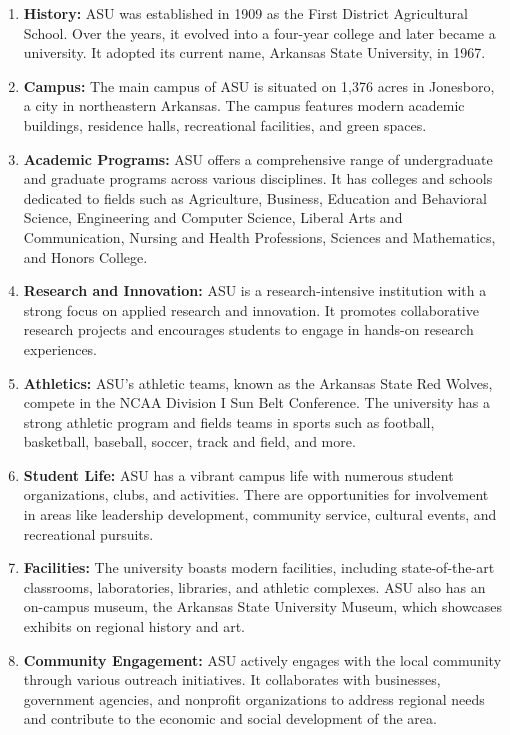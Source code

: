 \documentclass[
  letterpaper,
  DIV=11,
  numbers=noendperiod]{scrartcl}
\begin{document}
\begin{enumerate}
\def\labelenumi{\arabic{enumi}.}
\item
  \textbf{History:} ASU was established in 1909 as the First District
  Agricultural School. Over the years, it evolved into a four-year
  college and later became a university. It adopted its current name,
  Arkansas State University, in 1967.
\item
  \textbf{Campus:} The main campus of ASU is situated on 1,376 acres in
  Jonesboro, a city in northeastern Arkansas. The campus features modern
  academic buildings, residence halls, recreational facilities, and
  green spaces.
\item
  \textbf{Academic Programs:} ASU offers a comprehensive range of
  undergraduate and graduate programs across various disciplines. It has
  colleges and schools dedicated to fields such as Agriculture,
  Business, Education and Behavioral Science, Engineering and Computer
  Science, Liberal Arts and Communication, Nursing and Health
  Professions, Sciences and Mathematics, and Honors College.
\item
  \textbf{Research and Innovation:} ASU is a research-intensive
  institution with a strong focus on applied research and innovation. It
  promotes collaborative research projects and encourages students to
  engage in hands-on research experiences.
\item
  \textbf{Athletics:} ASU's athletic teams, known as the Arkansas State
  Red Wolves, compete in the NCAA Division I Sun Belt Conference. The
  university has a strong athletic program and fields teams in sports
  such as football, basketball, baseball, soccer, track and field, and
  more.
\item
  \textbf{Student Life:} ASU has a vibrant campus life with numerous
  student organizations, clubs, and activities. There are opportunities
  for involvement in areas like leadership development, community
  service, cultural events, and recreational pursuits.
\item
  \textbf{Facilities:} The university boasts modern facilities,
  including state-of-the-art classrooms, laboratories, libraries, and
  athletic complexes. ASU also has an on-campus museum, the Arkansas
  State University Museum, which showcases exhibits on regional history
  and art.
\item
  \textbf{Community Engagement:} ASU actively engages with the local
  community through various outreach initiatives. It collaborates with
  businesses, government agencies, and nonprofit organizations to
  address regional needs and contribute to the economic and social
  development of the area.
\end{enumerate}
\end{document}
